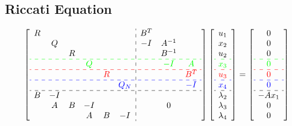 \subsection{Riccati Equation}
\begin{equation}
    \left[ \begin{array}{cccccc:ccc}
        R&		&		&		&		&		&		B^T&		&		\\
        &		Q&		&		&		&		&		-I&		A^{-1}&		\\
        &		&		R&		&		&		&		&		B^{-1}&		\\
        \arrayrulecolor{green}\hdashline
        &		&		&		\textcolor{green}{Q}&		&		&		&		\textcolor{green}{-I}&		\textcolor{green}{A}\\
        \arrayrulecolor{red}\hdashline
        &		&		&		&		\textcolor{red}{R}&		&		&		&		\textcolor{red}{B^T}\\
        \arrayrulecolor{blue}\hdashline
        &		&		&		&		&		\textcolor{blue}{Q_N}&		&		&		\textcolor{blue}{-I}\\
        \arrayrulecolor{black}\hdashline
        B&		-I&		&		&		&		&		&		&		\\
        &		A&		B&		-I&		&		&		&		0&		\\
        &		&		&		A&		B&		-I&		&		&		\\
    \end{array} \right] \left[ \begin{array}{c}
        u_1\\
        x_2\\
        u_2\\
        \arrayrulecolor{green}\hdashline
        \textcolor{green}{x_3}\\
        \arrayrulecolor{red}\hdashline
        \textcolor{red}{u_3}\\
        \arrayrulecolor{blue}\hdashline
        \textcolor{blue}{x_4}\\
        \arrayrulecolor{black}\hdashline
        \lambda _2\\
        \lambda _3\\
        \lambda _4\\
    \end{array} \right] =\left[ \begin{array}{c}
        0\\
        0\\
        0\\
        \arrayrulecolor{green}\hdashline
        \textcolor{green}{0}\\
        \arrayrulecolor{red}\hdashline
        \textcolor{red}{0}\\
        \arrayrulecolor{blue}\hdashline
        \textcolor{blue}{0}\\
        \arrayrulecolor{black}\hdashline
        -Ax_1\\
        0\\
        0\\
    \end{array} \right] 
\end{equation}

